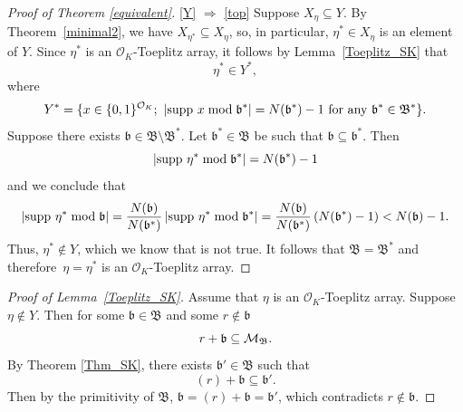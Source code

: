 \documentclass[leqno,a4paper,12pt]{article}
\theoremstyle{definition}
\newcommand{\cm}{{\cal M}}
\newcommand{\OK}{\mathcal{O}_K}
\def\supp{{\rm supp }}
\begin{document}
\begin{proof}[Proof of Theorem \ref{equivalent}]
\eqref{Y} $\Rightarrow$ \eqref{top} Suppose $X_\eta\subseteq Y$. By Theorem~\ref{minimal2}, we have $X_{\eta^*}\subseteq X_\eta	$, so, in particular, $\eta^*\in X_\eta$ is an element of $Y$. Since $\eta^*$ is an $\OK$-Toeplitz array, it follows by  Lemma~\ref{Toeplitz_SK} that
\[
\eta^*\in Y^*,
\]
where
\[
Y^*=\{x\in\{0,1\}^{\OK};\ |\supp \ x\bmod \mathfrak{b}^*|=N(\mathfrak{b}^*)-1 \text{ for any }\mathfrak{b}^*\in\mathfrak{B}^*\}.
\]
Suppose there exists $\mathfrak{b}\in\mathfrak{B}\setminus\mathfrak{B}^*$. Let $\mathfrak{b}^*\in\mathfrak{B}$ be such that $\mathfrak{b}\subseteq\mathfrak{b}^*$. Then \[|\supp \ \eta^* \bmod \mathfrak{b}^*|=N(\mathfrak{b}^*)-1
\]
and we conclude that
\[
\left|\supp \ \eta^* \bmod \mathfrak{b}\right|=\frac{N(\mathfrak{b})}{N(\mathfrak{b}^*)}\left|\supp \ \eta^* \bmod \mathfrak{b}^*\right|=\frac{N(\mathfrak{b})}{N(\mathfrak{b}^*)}\left(N(\mathfrak{b}^*)-1\right)<N(\mathfrak{b})-1.
\]
Thus, $\eta^*\not\in Y$, which we know that is not true. It follows that $\mathfrak{B}=\mathfrak{B}^*$ and therefore~$\eta=\eta^*$ is an $\OK$-Toeplitz array.
\end{proof}

\begin{proof}[Proof of Lemma~\ref{Toeplitz_SK}]
Assume that $\eta$ is an $\OK$-Toeplitz array. Suppose $\eta\not\in Y$. Then for some $\mathfrak{b}\in\mathfrak{B}$ and some $r\not\in\mathfrak{b}$
\[r+\mathfrak{b}\subseteq\cm_\mathfrak{B}.\]
By Theorem \ref{Thm_SK}, there exists $\mathfrak{b}'\in\mathfrak{B}$ such that
\[(r)+\mathfrak{b}\subseteq\mathfrak{b}'.\]
Then by the primitivity of $\mathfrak{B}$, $\mathfrak{b}=(r)+\mathfrak{b}=\mathfrak{b}'$, which contradicts $r\not\in\mathfrak{b}$.
\end{proof}
\end{document}
